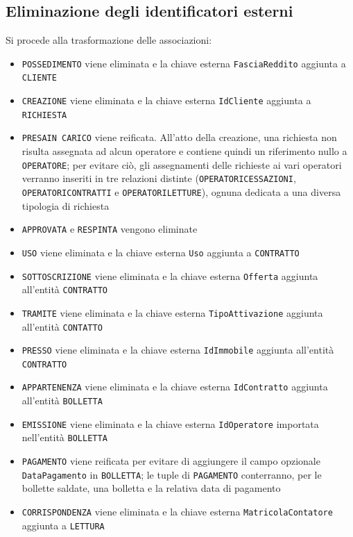 \documentclass[a4paper,12pt]{report}
\begin{document}
\subsection{Eliminazione degli identificatori esterni}
Si procede alla trasformazione delle associazioni:
\begin{itemize}
    \item \texttt{POSSEDIMENTO} viene eliminata e la chiave esterna \texttt{FasciaReddito} aggiunta a \texttt{CLIENTE}
    \item \texttt{CREAZIONE} viene eliminata e la chiave esterna \texttt{IdCliente} aggiunta a \texttt{RICHIESTA}
    \item \texttt{PRESA\textunderscore IN \textunderscore CARICO} viene reificata. All'atto della creazione, una richiesta non risulta assegnata ad alcun operatore e contiene quindi un riferimento nullo a \texttt{OPERATORE}; per evitare ciò, gli assegnamenti delle richieste ai vari operatori verranno inseriti in tre relazioni distinte (\texttt{OPERATORI\textunderscore CESSAZIONI}, \texttt{OPERATORI\textunderscore CONTRATTI} e \texttt{OPERATORI\textunderscore LETTURE}), ognuna dedicata a una diversa tipologia di richiesta
    \item \texttt{APPROVATA} e \texttt{RESPINTA} vengono eliminate
    \item \texttt{USO} viene eliminata e la chiave esterna \texttt{Uso} aggiunta a \texttt{CONTRATTO}
    \item \texttt{SOTTOSCRIZIONE} viene eliminata e la chiave esterna \texttt{Offerta} aggiunta all'entità \texttt{CONTRATTO}
    \item \texttt{TRAMITE} viene eliminata e la chiave esterna \texttt{TipoAttivazione} aggiunta all'entità \texttt{CONTATTO}
    \item \texttt{PRESSO} viene eliminata e la chiave esterna \texttt{IdImmobile} aggiunta all'entità \texttt{CONTRATTO}
    \item \texttt{APPARTENENZA} viene eliminata e la chiave esterna \texttt{IdContratto} aggiunta all'entità \texttt{BOLLETTA}
    \item \texttt{EMISSIONE} viene eliminata e la chiave esterna \texttt{IdOperatore} importata nell'entità \texttt{BOLLETTA}
    \item \texttt{PAGAMENTO} viene reificata per evitare di aggiungere il campo opzionale \texttt{DataPagamento} in \texttt{BOLLETTA}; le tuple di \texttt{PAGAMENTO} conterranno, per le bollette saldate, una bolletta e la relativa data di pagamento
    \item \texttt{CORRISPONDENZA} viene eliminata e la chiave esterna \texttt{MatricolaContatore} aggiunta a \texttt{LETTURA}

\end{itemize}
\end{document}
